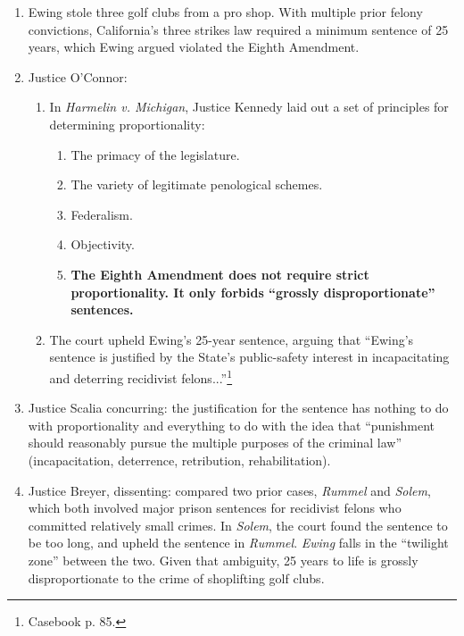 \begin{enumerate}
    \item Ewing stole three golf clubs from a pro shop. With multiple prior 
    felony convictions, California's three strikes law required a minimum 
    sentence of 25 years, which Ewing argued violated the Eighth Amendment.
    \item Justice O'Connor:
    \begin{enumerate}
        \item In \emph{Harmelin v. Michigan}, Justice Kennedy laid out a set 
        of principles for determining proportionality:
        \begin{enumerate}
            \item The primacy of the legislature.
            \item The variety of legitimate penological schemes.
            \item Federalism.
            \item Objectivity.
            \item \textbf{The Eighth Amendment does not require strict 
            proportionality. It only forbids ``grossly disproportionate'' 
            sentences.}
        \end{enumerate}
        \item The court upheld Ewing's 25-year sentence, arguing that 
        ``Ewing's sentence is justified by the State's public-safety interest 
        in incapacitating and deterring recidivist 
        felons...''\footnote{Casebook p.  85.}
    \end{enumerate}
    \item Justice Scalia concurring: the justification for the sentence has 
    nothing to do with proportionality and everything to do with the idea that 
    ``punishment should reasonably pursue the multiple purposes of the 
    criminal law'' (incapacitation, deterrence, retribution, rehabilitation).
    \item Justice Breyer, dissenting: compared two prior cases, \emph{Rummel} 
    and \emph{Solem}, which both involved major prison sentences for 
    recidivist felons who committed relatively small crimes.  In \emph{Solem}, 
    the court found the sentence to be too long, and upheld the sentence in 
    \emph{Rummel}. \emph{Ewing} falls in the ``twilight zone'' between the 
    two. Given that ambiguity, 25 years to life is grossly disproportionate to 
    the crime of shoplifting golf clubs.
\end{enumerate}

